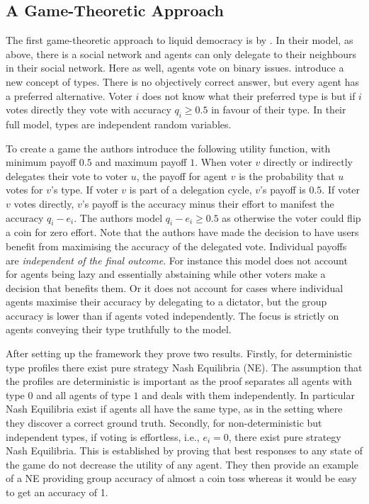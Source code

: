 \documentclass[11pt,a4paper, titlepage]{article}
\theoremstyle{definition}
\begin{document}
\subsection{A Game-Theoretic Approach}

The first game-theoretic approach to liquid democracy is by \citet{bloembergen2019rational}.
In their model, as above, there is a social network and agents can only delegate to their neighbours in their social network. Here as well, agents vote on binary issues.
\citeauthor{bloembergen2019rational} introduce a new concept of types. 
There is no objectively correct answer, but every agent has a preferred alternative.
Voter $i$ does not know what their preferred type is but if $i$ votes directly they vote with accuracy $q_i \geq 0.5$ in favour of their type.
In their full model, types are independent random variables.

To create a game the authors introduce the following utility function, with minimum payoff $0.5$ and maximum payoff $1$.
When voter $v$ directly or indirectly delegates their vote to voter $u$, the payoff for agent $v$ is the probability that $u$ votes for $v$'s type.
If voter $v$ is part of a delegation cycle, $v$'s payoff is $0.5$.
If voter $v$ votes directly, $v$'s payoff is the accuracy minus their effort to manifest the accuracy $q_i - e_i$.
The authors model $q_i - e_i \geq 0.5$ as otherwise the voter could flip a coin for zero effort.
Note that the authors have made the decision to have users benefit from maximising the accuracy of the delegated vote.
Individual payoffs are \emph{independent of the final outcome}.
For instance this model does not account for agents being lazy and essentially abstaining while other voters make a decision that benefits them.
Or it does not account for cases where individual agents maximise their accuracy by delegating to a dictator, but the group accuracy is lower than if agents voted independently.
The focus is strictly on agents conveying their type truthfully to the model.

After setting up the framework they prove two results. 
Firstly, for deterministic type profiles there exist pure strategy Nash Equilibria (NE).
The assumption that the profiles are deterministic is important as the proof separates all agents with type $0$ and all agents of type $1$ and deals with them independently.
In particular Nash Equilibria exist if agents all have the same type, as in the setting where they discover a correct ground truth.
Secondly, for non-deterministic but independent types, if voting is effortless, i.e., $e_i = 0$, there exist pure strategy Nash Equilibria.
This is established by proving that best responses to any state of the game do not decrease the utility of any agent.
They then provide an example of a NE providing group accuracy of almost a coin toss whereas it would be easy to get an accuracy of 1. 
\end{document}
